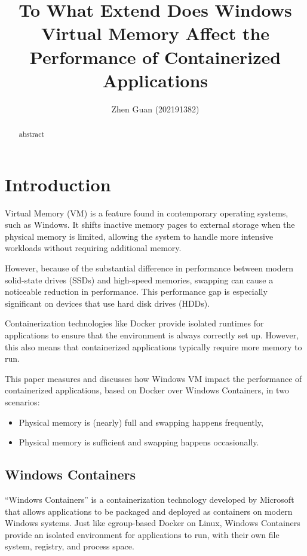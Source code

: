 \documentclass{IEEEtran}
\author{Zhen Guan (202191382)}
\title{To What Extend Does Windows Virtual Memory Affect the Performance of Containerized Applications}
\begin{document}
\maketitle

\begin{abstract}
    abstract
\end{abstract}

\suppressUnderfullBoxes
\makeTableOfContents

\section{Introduction}

Virtual Memory (VM) is a feature found in contemporary operating systems, such as Windows. It shifts inactive memory pages to external storage when the physical memory is limited, allowing the system to handle more intensive workloads without requiring additional memory.

However, because of the substantial difference in performance between modern solid-state drives (SSDs) and high-speed memories, swapping can cause a noticeable reduction in performance. This performance gap is especially significant on devices that use hard disk drives (HDDs).

Containerization technologies like Docker provide isolated runtimes for applications to ensure that the environment is always correctly set up. However, this also means that containerized applications typically require more memory to run.

This paper measures and discusses how Windows VM impact the performance of containerized applications, based on Docker over Windows Containers, in two scenarios:

\begin{itemize}
    \item Physical memory is (nearly) full and swapping happens frequently,
    \item Physical memory is sufficient and swapping happens occasionally.
\end{itemize}

\subsection{Windows Containers}

``Windows Containers'' is a containerization technology developed by Microsoft that allows applications to be packaged and deployed as containers on modern Windows systems. Just like cgroup-based Docker on Linux, Windows Containers provide an isolated environment for applications to run, with their own file system, registry, and process space.
\end{document}
